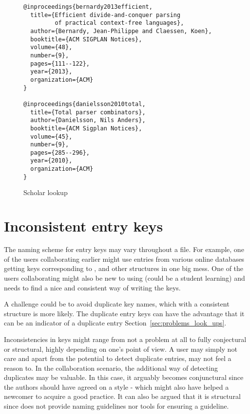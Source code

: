 \begin{figure}
  \centering
\begin{verbatim}
@inproceedings{bernardy2013efficient,
  title={Efficient divide-and-conquer parsing
         of practical context-free languages},
  author={Bernardy, Jean-Philippe and Claessen, Koen},
  booktitle={ACM SIGPLAN Notices},
  volume={48},
  number={9},
  pages={111--122},
  year={2013},
  organization={ACM}
}

@inproceedings{danielsson2010total,
  title={Total parser combinators},
  author={Danielsson, Nils Anders},
  booktitle={ACM Sigplan Notices},
  volume={45},
  number={9},
  pages={285--296},
  year={2010},
  organization={ACM}
}
\end{verbatim}
  \caption{Scholar lookup}
\label{fig:missing_org_scholar_lookup}
\end{figure}

\section{Inconsistent entry keys}
\label{sec:problems_inconsistent_keys}

The naming scheme for entry keys may vary throughout a {\bibtex} file.
For example, one of the users collaborating earlier might use entries
from various online databases getting keys corresponding to
,  and
other structures in one big mess.  One of the users collaborating
might also be new to using {\bibtex} (could be a student learning) and
needs to find a nice and consistent way of writing the keys.

A challenge could be to avoid duplicate key names, which with a
consistent structure is more likely.  The duplicate entry keys can
have the advantage that it can be an indicator of a duplicate entry
Section~\ref{sec:problems_look_ups}.

Inconsistencies in keys might range from not a problem at all to fully
conjectural or structural, highly depending on one's point of view.  A
user may simply not care and apart from the potential to detect
duplicate entries, may not feel a reason to.  In the collaboration
scenario, the additional way of detecting duplicates may be valuable.
In this case, it arguably becomes conjunctural since the authors
should have agreed on a style - which might also have helped a
newcomer to acquire a good practice.  It can also be argued that it is
structural since {\bibtex} does not provide naming guidelines nor
tools for ensuring a guideline.

